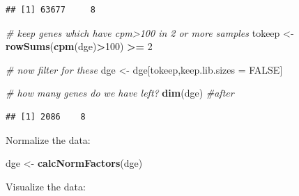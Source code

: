 \documentclass[
]{book}
\newenvironment{Shaded}{\begin{snugshade}}{\end{snugshade}}
\newcommand{\AttributeTok}[1]{\textcolor[rgb]{0.13,0.29,0.53}{#1}}
\newcommand{\CommentTok}[1]{\textcolor[rgb]{0.56,0.35,0.01}{\textit{#1}}}
\newcommand{\ConstantTok}[1]{\textcolor[rgb]{0.56,0.35,0.01}{#1}}
\newcommand{\DecValTok}[1]{\textcolor[rgb]{0.00,0.00,0.81}{#1}}
\newcommand{\FunctionTok}[1]{\textcolor[rgb]{0.13,0.29,0.53}{\textbf{#1}}}
\newcommand{\NormalTok}[1]{#1}
\newcommand{\OtherTok}[1]{\textcolor[rgb]{0.56,0.35,0.01}{#1}}
\newcommand{\SpecialCharTok}[1]{\textcolor[rgb]{0.81,0.36,0.00}{\textbf{#1}}}
\newcommand{\StringTok}[1]{\textcolor[rgb]{0.31,0.60,0.02}{#1}}
\begin{document}
\begin{verbatim}
## [1] 63677     8
\end{verbatim}

\begin{Shaded}
\begin{Highlighting}[]
\CommentTok{\# keep genes which have cpm\textgreater{}100 in 2 or more samples}
\NormalTok{tokeep }\OtherTok{\textless{}{-}} \FunctionTok{rowSums}\NormalTok{(}\FunctionTok{cpm}\NormalTok{(dge)}\SpecialCharTok{\textgreater{}}\DecValTok{100}\NormalTok{) }\SpecialCharTok{\textgreater{}=} \DecValTok{2} 

\CommentTok{\# now filter for these}
\NormalTok{dge }\OtherTok{\textless{}{-}}\NormalTok{ dge[tokeep,keep.lib.sizes }\OtherTok{=} \ConstantTok{FALSE}\NormalTok{]}

\CommentTok{\# how many genes do we have left?}
\FunctionTok{dim}\NormalTok{(dge) }\CommentTok{\#after}
\end{Highlighting}
\end{Shaded}

\begin{verbatim}
## [1] 2086    8
\end{verbatim}

Normalize the data:

\begin{Shaded}
\begin{Highlighting}[]
\NormalTok{dge }\OtherTok{\textless{}{-}} \FunctionTok{calcNormFactors}\NormalTok{(dge)}
\end{Highlighting}
\end{Shaded}

Visualize the data:

\begin{Shaded}
\end{Shaded}
\end{document}
